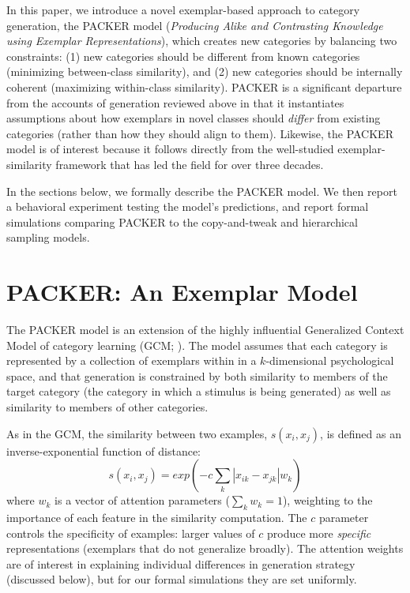 \documentclass[10pt,letterpaper]{article}
\begin{document}
In this paper, we introduce a novel exemplar-based approach to category generation, the PACKER model (\textit{Producing Alike and Contrasting Knowledge using Exemplar Representations}), which creates new categories by balancing two constraints: (1) new categories should be different from known categories (minimizing between-class similarity), and (2) new categories should be internally coherent (maximizing within-class similarity). PACKER is a significant departure from the accounts of generation reviewed above in that it instantiates assumptions about how exemplars in novel classes should \textit{differ} from existing categories (rather than how they should align to them). Likewise, the PACKER model is of interest because it follows directly from the well-studied exemplar-similarity framework that has led the field for over three decades.

In the sections below, we formally describe the PACKER model. We then report a behavioral experiment testing the model's predictions, and report formal simulations comparing PACKER to the copy-and-tweak and hierarchical sampling models.

\section{PACKER: An Exemplar Model}

The PACKER model is an extension of the highly influential Generalized Context Model of category learning (GCM; \citealp{nosofsky1984choice}). The model assumes that each category is represented by a collection of exemplars within in a $k$-dimensional psychological space, and that generation is constrained by both similarity to members of the target category (the category in which a stimulus is being generated) as well as similarity to members of other categories. 

As in the GCM, the similarity between two examples, $s(x_i, x_j)$, is defined as an inverse-exponential function of distance:
\begin{equation}
  s(x_i,x_j) = exp( -c \sum_{k}{|x_{ik} - x_{jk}|}w_k ) 
\end{equation}
where $w_k$ is a vector of attention parameters ($\sum_k{w_k} = 1$), weighting to the importance of each feature in the similarity computation. The $c$ parameter controls the specificity of examples: larger values of $c$ produce more \textit{specific} representations (exemplars that do not generalize broadly). The attention weights are of interest in explaining individual differences in generation strategy (discussed below), but for our formal simulations they are set uniformly.
\end{document}
